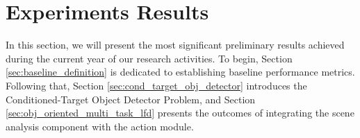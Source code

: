 \section{Experiments Results}
\label{sec:experiment_results}
In this section, we will present the most significant preliminary results achieved during the current year of our research activities. To begin, Section \ref{sec:baseline_definition} is dedicated to establishing baseline performance metrics. Following that, Section \ref{sec:cond_target_obj_detector} introduces the Conditioned-Target Object Detector Problem, and Section \ref{sec:obj_oriented_multi_task_lfd} presents the outcomes of integrating the scene analysis component with the action module.





